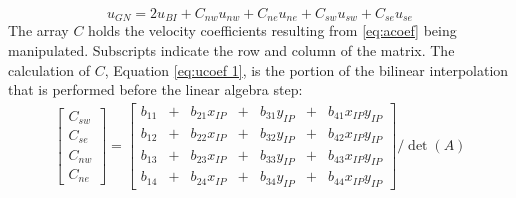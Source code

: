 \documentclass[preprint,12pt]{elsarticle}
\begin{document}
\begin{equation}
u_{GN} = 2u_{BI} + C_{nw}u_{nw} + C_{ne}u_{ne} + C_{sw}u_{sw} + C_{se}u_{se}\label{eq:ID reorganized interpolation}
\end{equation}
The array $C$ holds the velocity coefficients resulting from \eqref{eq:acoef} being manipulated. 
Subscripts indicate the row and column of the matrix. 
The calculation of $C$, Equation \eqref{eq:ucoef 1}, is the portion of the bilinear interpolation that is performed before the linear algebra step:
\begin{gather}
\begin{bmatrix}
C_{sw}\\
C_{se}\\
C_{nw}\\
C_{ne}
\end{bmatrix}
=
\begin{bmatrix}
b_{11}&+&b_{21}x_{IP}&+&b_{31}y_{IP}&+&b_{41}x_{IP}y_{IP}\\
b_{12}&+&b_{22}x_{IP}&+&b_{32}y_{IP}&+&b_{42}x_{IP}y_{IP}\\
b_{13}&+&b_{23}x_{IP}&+&b_{33}y_{IP}&+&b_{43}x_{IP}y_{IP}\\
b_{14}&+&b_{24}x_{IP}&+&b_{34}y_{IP}&+&b_{44}x_{IP}y_{IP}
\end{bmatrix}
/\det{(A)}
\label{eq:ucoef 1}
\end{gather}
\end{document}
